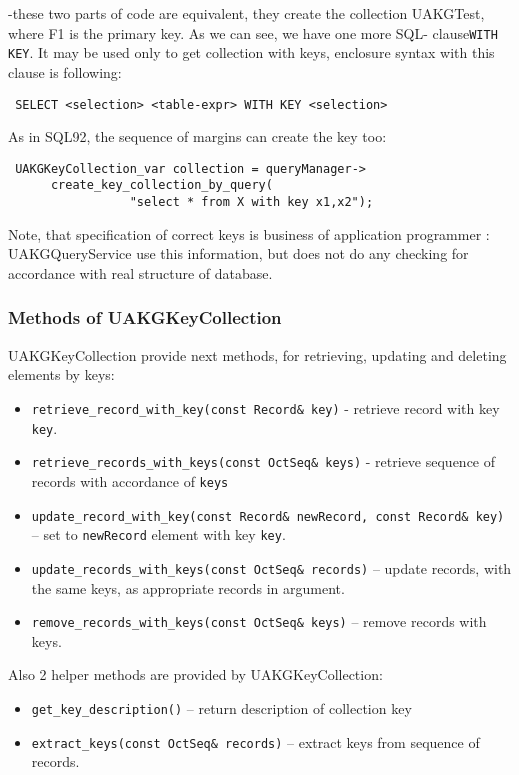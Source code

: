 -these two parts of code are equivalent,  they create the collection UAKGTest, where F1 is the primary key.  As we can see, we have one more SQL- clause\verb|WITH KEY|.
It may be used only to get collection with keys, enclosure syntax with this clause is following:

\begin{verbatim}
 SELECT <selection> <table-expr> WITH KEY <selection>
\end{verbatim}

As in SQL92,  the sequence of margins can create the key too:
 \begin{verbatim}
 UAKGKeyCollection_var collection = queryManager->
      create_key_collection_by_query(
                 "select * from X with key x1,x2");
\end{verbatim}


 Note, that specification of correct keys is business of application 
programmer : UAKGQueryService use this information, but does not do
any checking for accordance with real structure of database.

\subsubsection{ Methods of UAKGKeyCollection }

 UAKGKeyCollection provide next methods, for retrieving, updating
 and deleting  elements by keys:

 \begin{itemize}
   \item \verb|retrieve_record_with_key(const Record& key)| - retrieve record with key \verb|key|.
   \item \verb|retrieve_records_with_keys(const OctSeq& keys)| - retrieve sequence of records with accordance of \verb|keys|
   \item \verb|update_record_with_key(const Record& newRecord, const Record& key)| -- set to \verb|newRecord| element with key \verb|key|.
   \item \verb|update_records_with_keys(const OctSeq& records)| -- update records, with the same keys, as appropriate records in argument.
   \item \verb|remove_records_with_keys(const OctSeq& keys)| -- remove records with keys.
 \end{itemize}

 Also 2 helper methods are provided by UAKGKeyCollection:

 \begin{itemize}
   \item \verb|get_key_description()| -- return description of collection key
   \item \verb|extract_keys(const OctSeq& records)| -- extract keys from sequence of records.
 \end{itemize}

